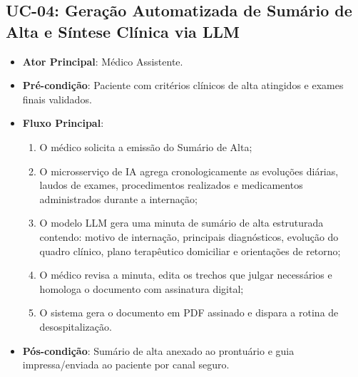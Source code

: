 \documentclass[12pt,oneside,a4paper,article]{abntex2}
\begin{document}
\subsection{UC-04: Geração Automatizada de Sumário de Alta e Síntese Clínica via LLM}
\begin{itemize}[noitemsep]
  \item \textbf{Ator Principal}: Médico Assistente.
  \item \textbf{Pré-condição}: Paciente com critérios clínicos de alta atingidos e exames finais validados.
  \item \textbf{Fluxo Principal}:
  \begin{enumerate}[noitemsep]
    \item O médico solicita a emissão do Sumário de Alta;
    \item O microsserviço de IA agrega cronologicamente as evoluções diárias, laudos de exames, procedimentos realizados e medicamentos administrados durante a internação;
    \item O modelo LLM gera uma minuta de sumário de alta estruturada contendo: motivo de internação, principais diagnósticos, evolução do quadro clínico, plano terapêutico domiciliar e orientações de retorno;
    \item O médico revisa a minuta, edita os trechos que julgar necessários e homologa o documento com assinatura digital;
    \item O sistema gera o documento em PDF assinado e dispara a rotina de desospitalização.
  \end{enumerate}
  \item \textbf{Pós-condição}: Sumário de alta anexado ao prontuário e guia impressa/enviada ao paciente por canal seguro.
\end{itemize}
\end{document}

